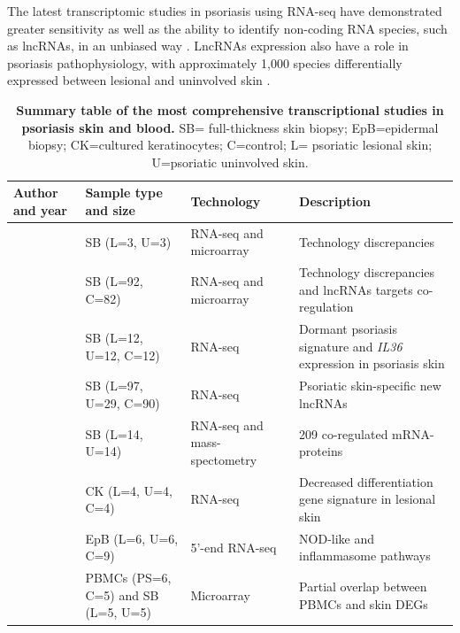 The latest transcriptomic studies in psoriasis using RNA-seq have demonstrated greater sensitivity as well as the ability to identify non-coding RNA species, such as lncRNAs, in an unbiased way \parencite{Jabbari2012, Li2014,Tsoi2015}. LncRNAs expression also have a role in psoriasis pathophysiology, with approximately 1,000 species differentially expressed between lesional and uninvolved skin \parencite{Tsoi2015}. 


\begin{landscape}
\renewcommand{\arraystretch}{0.7}
\begin{center}
\begin{longtable}[htp]{p{.25\textheight} p{.40\textheight} p{.25\textheight} p{.60\textheight}}
\caption[Summary table of the most comprehensive transcriptional studies in psoriasis skin and blood.]{\textbf{Summary table of the most comprehensive transcriptional studies in psoriasis skin and blood.} SB= full-thickness skin biopsy; EpB=epidermal biopsy; CK=cultured keratinocytes; C=control; L= psoriatic lesional skin; U=psoriatic uninvolved skin.}
\label{tab:Skin_and_blood_transcriptomics} \\
\toprule
\textbf{Author and year} & \textbf{Sample type and size} & \textbf{Technology} & \textbf{Description}\\
\midrule
\midrule
\parencite{Jabbari2012}	   & SB (L=3, U=3)         & RNA-seq and microarray & Technology discrepancies     \\
\parencite{Li2014}	       & SB (L=92, C=82)       & RNA-seq and microarray & Technology discrepancies and lncRNAs targets co-regulation\\
\parencite{Keermann2015}	 & SB (L=12, U=12, C=12) & RNA-seq                & Dormant psoriasis signature and \textit{IL36} expression in psoriasis skin \\
\parencite{Tsoi2015}	     & SB (L=97, U=29, C=90) & RNA-seq                & Psoriatic skin-specific new lncRNAs\\
\parencite{Swindell2015}   & SB (L=14, U=14)       & RNA-seq and mass-spectometry & 209 co-regulated mRNA-proteins \\
\parencite{Swindell2017}	 & CK (L=4, U=4, C=4)    & RNA-seq                & Decreased differentiation gene signature in lesional skin\\
\parencite{Tervaniemi2016} & EpB (L=6, U=6, C=9)   & 5'-end RNA-seq                & NOD-like and inflammasome pathways\\
\parencite{Coda2012}   & PBMCs (PS=6, C=5) and SB (L=5, U=5)   & Microarray             & Partial overlap between PBMCs and skin DEGs\\

\end{longtable}
\end{center}
\end{landscape}
